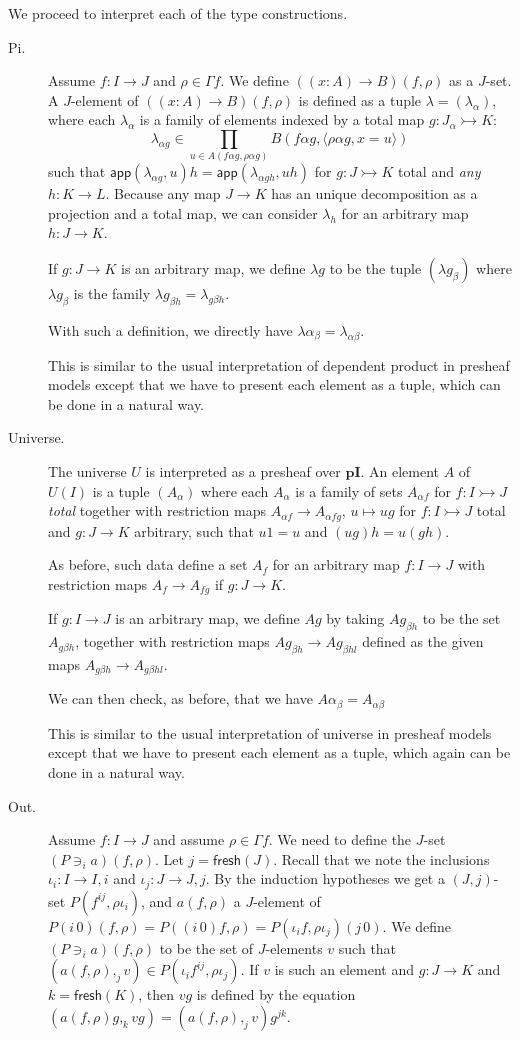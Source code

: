 \documentclass[english]{PaperTools/latex/lipics}
\newcommand\op[1]{∋_{#1}}
\def\pI{\ensuremath{\mathbf{pI}}}
\def\fresh#1{\mathsf{fresh}(#1)}
\def\app#1#2{\mathsf{app}(#1,#2)}
\begin{document}
\bigskip
We proceed to interpret each of the type constructions.
\begin{description}
  \item[\sc Pi.]
    Assume $f : I → J$ and $ρ ∈ Γf$. We define $((x:A) → B)(f,ρ)$ as a $J$-set.
    A $J$-element of $((x:A) → B)(f,ρ)$ is defined as a tuple $λ = (λ_α)$,
    where each $λ_α$ is a family of elements indexed by a total map $g : J_α ↣ K$:
    $$λ_{α g} ∈ \prod_{u ∈ A(fα g,ραg)} B(fαg,⟨ραg,x=u⟩)$$
    such that
    $\app{λ_{αg}}{u} h = \app{λ_{α gh}}{uh}$ for $g : J ↣ K$ total and \emph{any} $h : K → L$.
    Because any map $J → K$ has an unique decomposition as a projection and a total
    map, we can consider $λ_h$ for an arbitrary map $h : J → K$.

    If $g : J → K$ is an arbitrary map, we define $λ g$ to be the tuple
    $(λ g_β)$ where $λ g_β$ is the family $λ g_{βh} = λ_{gβh}$.

    With such a definition, we directly have $λα_{β} = λ_{αβ}$.

    This is similar to the usual interpretation of dependent product in
    presheaf models \citep{Hofmann97syntaxand,bezem2014model} except that we
    have to present each element as a tuple, which can be done in a natural way.


  \item[\sc Universe.]
    The universe $U$ is interpreted as a presheaf over \pI. An element $A$ of
    $U(I)$ is a tuple $(A_α)$ where each $A_α$ is a family of sets
    $A_{α f}$ for $f : I ↣ J$ \emph{total} together with restriction
    maps $A_{α f} → A_{α fg}$, $u ↦ ug$ for $f : I ↣ J$ total
    and $g : J → K$ arbitrary, such that $u1 = u$ and $(ug)h = u(gh)$.

    As before, such data define a set $A_f$ for an arbitrary map $f : I → J$
    with restriction maps $A_f → A_{fg}$ if $g : J → K$.

    If $g : I → J$ is an arbitrary map, we define $Ag$ by taking $Ag_{βh}$
    to be the set $A_{gβh}$, together with restriction maps $Ag_{βh} → Ag_{βhl}$
    defined as the given maps $A_{gβh} → A_{gβhl}$.

    We can then check, as before, that we have $Aα_{β} = A_{αβ}$

    This is similar to the usual interpretation of universe in
    presheaf models \citep{Hofmann97syntaxand,bezem2014model} except that we
    have to present each element as a tuple, which again can be done in a natural way.


  \item[\sc Out.]
    Assume $f : I → J$ and assume $ρ ∈ Γf$.  We need to define the $J$-set $(P \op {i} a)(f,ρ)$.
    Let $j = \fresh J$.
    Recall that we note the inclusions $ι_i : I → I,i$ and $ι_j : J → J,j$.
    By the induction hypotheses we get a $(J,j)$-set $P(f^{ij},ρι_i)$, and $a(f,ρ)$
    a $J$-element of $P(i\,0)(f,ρ) = P((i\,0)f,ρ) = P(ι_i f,ρι_j)(j\,0)$.
    We define $(P \op {i} a)(f,ρ)$ to be the set of $J$-elements $v$ such that
    $(a(f,ρ),_j v) ∈ P(ι_i f^{ij},ρι_j)$. If $v$ is such an element and $g : J → K$
    and $k=\fresh K$, then $vg$ is defined by the equation
    $(a(f,ρ)g,_k vg) = (a(f,ρ) ,_j v) g^{jk}$.



\end{description}
\end{document}
